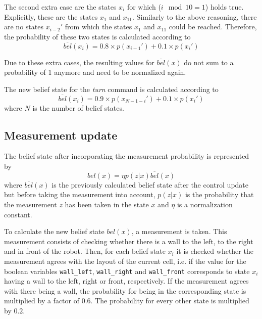 \documentclass[10pt,a4paper]{article}
\begin{document}
		The second extra case are the states $x_i$ for which ($i \mod{10}=1$) holds true. Explicitly, these are the states $x_1$ and $x_{11}$. Similarly to the above reasoning, there are no states $x_{i-2}'$ from which the states $x_1$ and $x_{11}$ could be reached. Therefore, the probability of these two states is calculated according to		
		\begin{displaymath}
			\overline{bel}(x_i) = 0.8\times p(x_{i-1}') + 0.1\times p(x_i')
		\end{displaymath}
		
		Due to these extra cases, the resulting values for $\overline{bel}(x)$ do not sum to a probability of 1 anymore and need to be normalized again.
		
		The new belief state for the \textit{turn} command is calculated according to		
		\begin{displaymath}
			\overline{bel}(x_i) = 0.9\times p(x_{N-1-i}') + 0.1\times p(x_i')
		\end{displaymath}
		where $N$ is the number of belief states.
		
		\subsection{Measurement update}
		The belief state after incorporating the measurement probability is represented by
		\begin{displaymath}
			bel(x)=\eta p(z|x)\overline{bel}(x)
		\end{displaymath}
		where $\overline{bel}(x)$ is the previously calculated belief state after the control update but before taking the measurement into account, $p(z|x)$ is the probability that the measurement $z$ has been taken in the state $x$ and $\eta$ is a normalization constant.
		
		To calculate the new belief state $bel(x)$, a measurement is taken. This measurement consists of checking whether there is a wall to the left, to the right and in front of the robot. Then, for each belief state $x_i$ it is checked whether the measurement agrees with the layout of the current cell, i.e. if the value for the boolean variables \verb|wall_left|, \verb|wall_right| and \verb|wall_front| corresponds to state $x_i$ having a wall to the left, right or front, respectively. If the measurement agrees with there being a wall, the probability for being in the corresponding state is multiplied by a factor of $0.6$. The probability for every other state is multiplied by $0.2$.
		
\end{document}
